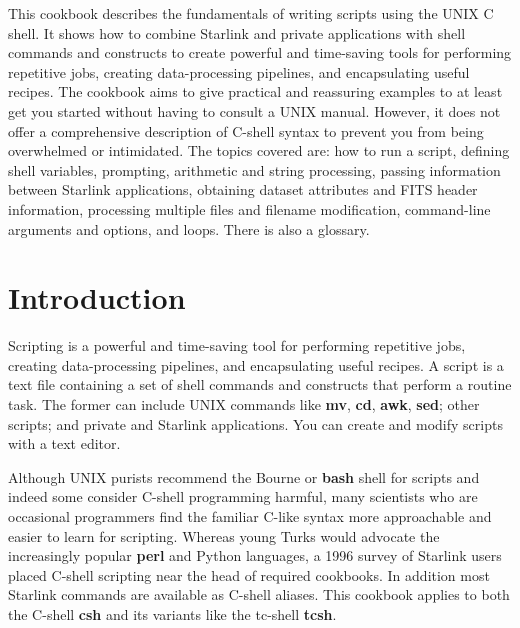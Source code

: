 \documentclass[twoside,11pt]{article}
\newcommand{\stardocinitials}  {SC}
\newcommand{\stardocnumber}    {4.4}
\newcommand{\stardocabstract}  {
This cookbook describes the fundamentals of writing scripts using
the UNIX C shell.  It shows how to combine Starlink and private applications
with shell commands and constructs to create powerful and time-saving
tools for performing repetitive jobs, creating data-processing
pipelines, and encapsulating useful recipes.  The cookbook aims to give
practical and reassuring examples to at least get you started without
having to consult a UNIX manual.  However, it does not offer a
comprehensive description of C-shell syntax to prevent you from
being overwhelmed or intimidated.  The topics covered are: how to run a
script, defining shell variables, prompting, arithmetic and string
processing, passing information between Starlink applications, obtaining
dataset attributes and FITS header information, processing multiple
files and filename modification, command-line arguments and options, and
loops.  There is also a glossary.}
\newcommand{\stardocname}{\stardocinitials /\stardocnumber}
\newcommand{\htmladdnormallink}[2]{#1}
\newenvironment{latexonly}{}{}
\newcommand{\htmlref}[2]{#1}
\newcommand{\xlabel}[1]{}
\newcommand{\latexonlytoc}[0]{\tableofcontents}
\renewcommand{\thepage}{\roman{page}}
\begin{document}
\stardocabstract

  \newpage
  \begin{latexonly}
    \setlength{\parskip}{0mm}
    \latexonlytoc
    \setlength{\parskip}{\medskipamount}
    \markboth{\stardocname}{\stardocname}
 \end{latexonly}
\cleardoublepage
\renewcommand{\thepage}{\arabic{page}}
\setcounter{page}{1}


\section{\xlabel{sc4_se_intro}Introduction\label{sc4_se_intro}}

Scripting is a powerful and time-saving tool for performing repetitive
jobs, creating data-processing pipelines, and encapsulating useful
recipes.  A script is a text file containing a set of
\htmlref{{\sf shell}}{sc4_gl_she} commands and constructs that perform
a routine task.  The former can include UNIX commands like {\bf mv},
{\bf cd}, {\bf awk}, {\bf sed}; other scripts; and private and
Starlink applications.  You can create and modify scripts with a text
editor.

Although UNIX purists recommend the Bourne or {\bf bash} shell for
scripts and indeed some consider \htmladdnormallink{C-shell
programming
harmful}{http://www.unix.org.ua/orelly/unix/upt/ch47_02.htm}, many
scientists who are occasional programmers find the familiar C-like syntax
more approachable and easier to learn for scripting.  Whereas young
Turks would advocate the increasingly popular \htmladdnormallink{{\bf
perl}}{http://www.perl.com/} and
\htmladdnormallink{Python}{http://www.python.org/} languages, a 1996
survey of Starlink users placed C-shell scripting near the head of
required cookbooks.  In addition most Starlink commands are available
as C-shell aliases.  This cookbook applies to both the C-shell {\bf
csh} and its variants like the tc-shell {\bf tcsh}.
\end{document}
